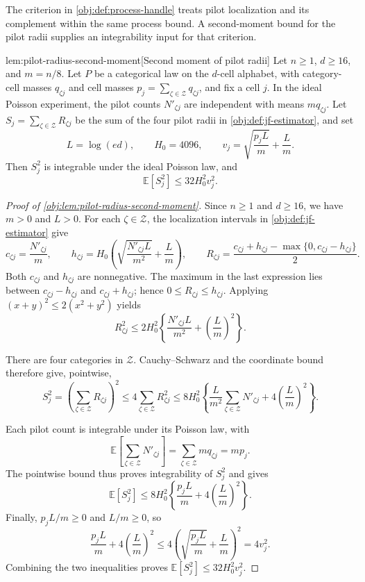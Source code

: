 \documentclass[11pt]{article}
\begin{document}
The criterion in \cref{obj:def:process-handle} treats pilot localization and its complement within the same process bound. A second-moment bound for the pilot radii supplies an integrability input for that criterion.

\begin{lemmav}{lem:pilot-radius-second-moment}[Second moment of pilot radii]
Let \(n\geq 1\), \(d\geq 16\), and \(m=n/8\). Let \(P\) be a categorical law on the \(d\)-cell alphabet, with category-cell masses \(q_{\zeta j}\) and cell masses \(p_j=\sum_{\zeta\in\mathcal Z}q_{\zeta j}\), and fix a cell \(j\). In the ideal Poisson experiment, the pilot counts \(N'_{\zeta j}\) are independent with means \(m q_{\zeta j}\). Let \(S_j=\sum_{\zeta\in\mathcal Z}R_{\zeta j}\) be the sum of the four pilot radii in \cref{obj:def:jf-estimator}, and set
\[
L=\log(ed),\qquad H_0=4096,\qquad
v_j=\sqrt{\frac{p_jL}{m}}+\frac{L}{m}.
\]
Then \(S_j^2\) is integrable under the ideal Poisson law, and
\[
\mathbb E[S_j^2]\leq 32H_0^2v_j^2.
\]
\end{lemmav}

\begin{proof}[Proof of \cref{obj:lem:pilot-radius-second-moment}]
Since \(n\geq1\) and \(d\geq16\), we have \(m>0\) and \(L>0\). For each \(\zeta\in\mathcal Z\), the localization intervals in \cref{obj:def:jf-estimator} give
\[
c_{\zeta j}=\frac{N'_{\zeta j}}m,\qquad
h_{\zeta j}
=H_0\left(\sqrt{\frac{N'_{\zeta j}L}{m^2}}+\frac Lm\right),\qquad
R_{\zeta j}
=\frac{c_{\zeta j}+h_{\zeta j}
-\max\{0,c_{\zeta j}-h_{\zeta j}\}}2.
\]
Both \(c_{\zeta j}\) and \(h_{\zeta j}\) are nonnegative. The maximum in the last expression lies between \(c_{\zeta j}-h_{\zeta j}\) and \(c_{\zeta j}+h_{\zeta j}\); hence \(0\leq R_{\zeta j}\leq h_{\zeta j}\). Applying \((x+y)^2\leq2(x^2+y^2)\) yields
\[
R_{\zeta j}^2
\leq 2H_0^2\left\{
\frac{N'_{\zeta j}L}{m^2}
+\left(\frac Lm\right)^2
\right\}.
\]

There are four categories in \(\mathcal Z\). Cauchy–Schwarz and the coordinate bound therefore give, pointwise,
\[
S_j^2
=\left(\sum_{\zeta\in\mathcal Z}R_{\zeta j}\right)^2
\leq4\sum_{\zeta\in\mathcal Z}R_{\zeta j}^2
\leq8H_0^2\left\{
\frac L{m^2}\sum_{\zeta\in\mathcal Z}N'_{\zeta j}
+4\left(\frac Lm\right)^2
\right\}.
\]

Each pilot count is integrable under its Poisson law, with
\[
\mathbb E\!\left[\sum_{\zeta\in\mathcal Z}N'_{\zeta j}\right]
=\sum_{\zeta\in\mathcal Z}m q_{\zeta j}
=mp_j.
\]
The pointwise bound thus proves integrability of \(S_j^2\) and gives
\[
\mathbb E[S_j^2]
\leq8H_0^2\left\{
\frac{p_jL}{m}+4\left(\frac Lm\right)^2
\right\}.
\]
Finally, \(p_jL/m\geq0\) and \(L/m\geq0\), so
\[
\frac{p_jL}{m}+4\left(\frac Lm\right)^2
\leq4\left(\sqrt{\frac{p_jL}{m}}+\frac Lm\right)^2
=4v_j^2.
\]
Combining the two inequalities proves \(\mathbb E[S_j^2]\leq32H_0^2v_j^2\).
\end{proof}
\end{document}
